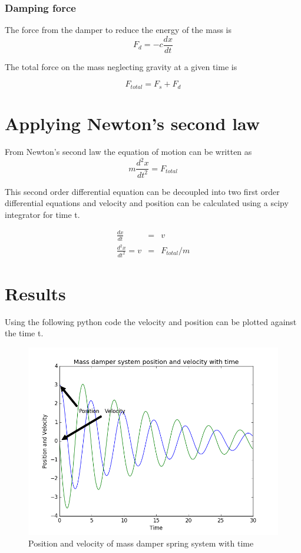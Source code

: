 \documentclass{article}
\begin{document}
\subsubsection{Damping force}

The force from the damper to reduce the energy of
the mass is 
\begin{equation}
  F_d = -c\frac{dx}{dt}
\end{equation}

The total force on the mass neglecting gravity at a given time is

\begin{equation}
  F_{total} = F_s + F_d
\end{equation}


\section{Applying Newton's second law}
From Newton's second law the equation of motion\cite{rao} can be written as
\begin{equation}
m \frac{d^{2}x}{dt^{2}} = F_{{total}} 
\end{equation}

This second order differential equation can be decoupled into two first
order differential equations and velocity and position can be
calculated using a scipy integrator for time t. 

\begin{eqnarray}
\frac{dx}{dt} &=& v \\
\frac{d^{2}x}{dt^{2}} = v &=& F_{total}/m 
\end{eqnarray}

\section{Results}

Using the following python code the velocity and position can be
plotted against the time t.



\begin{figure}
  \centering
  \includegraphics[width=0.9\linewidth]{result}
  \caption{Position and velocity of mass damper spring system with time}
\label{fig:result}
\end{figure}


\nocite{den}


\end{document}
